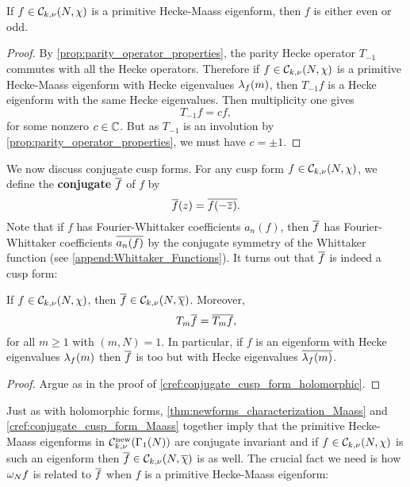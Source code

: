     \begin{proposition}\label{prop:Hecke_Maass_eigenform_even_or_odd}
      If $f \in \mathcal{C}_{k,\nu}(N,\chi)$ is a primitive Hecke-Maass eigenform, then $f$ is either even or odd.
    \end{proposition}
    \begin{proof}
      By \cref{prop:parity_operator_properties}, the parity Hecke operator $T_{-1}$ commutes with all the Hecke operators. Therefore if $f \in \mathcal{C}_{k,\nu}(N,\chi)$ is a primitive Hecke-Maass eigenform with Hecke eigenvalues $\lambda_{f}(m)$, then $T_{-1}f$ is a Hecke eigenform with the same Hecke eigenvalues. Then multiplicity one gives
      \[
        T_{-1}f = cf,
      \]
      for some nonzero $c \in \mathbb{C}$. But as $T_{-1}$ is an involution by \cref{prop:parity_operator_properties}, we must have $c = \pm 1$.
    \end{proof}
    
    We now discuss conjugate cusp forms. For any cusp form $f \in \mathcal{C}_{k,\nu}(N,\chi)$, we define the \textbf{conjugate} $\overline{f}$ of $f$ by
    \[
      \overline{f}(z) = \overline{f(-\overline{z})}.
    \]
    Note that if $f$ has Fourier-Whittaker coefficients $a_{n}(f)$, then $\overline{f}$ has Fourier-Whittaker coefficients $\overline{a_{n}(f)}$ by the conjugate symmetry of the Whittaker function (see \cref{append:Whittaker_Functions}). It turns out that $\overline{f}$ is indeed a cusp form:

    \begin{proposition}\label{cref:conjugate_cusp_form_Maass}
      If $f \in \mathcal{C}_{k,\nu}(N,\chi)$, then $\overline{f} \in \mathcal{C}_{k,\nu}(N,\overline{\chi})$. Moreover,
      \[
        T_{m}\overline{f} = \overline{T_{m}f},
      \]
      for all $m \ge 1$ with $(m,N) = 1$. In particular, if $f$ is an eigenform with Hecke eigenvalues $\lambda_{f}(m)$ then $\overline{f}$ is too but with Hecke eigenvalues $\overline{\lambda_{f}(m)}$.
    \end{proposition}
    \begin{proof}
      Argue as in the proof of \cref{cref:conjugate_cusp_form_holomorphic}.
    \end{proof}

    Just as with holomorphic forms, \cref{thm:newforms_characterization_Maass} and \cref{cref:conjugate_cusp_form_Maass} together imply that the primitive Hecke-Maass eigenforms in $\mathcal{C}_{k,\nu}^{\mathrm{new}}(\Gamma_{1}(N))$ are conjugate invariant and if $f \in \mathcal{C}_{k,\nu}(N,\chi)$ is such an eigenform then $\overline{f} \in \mathcal{C}_{k,\nu}(N,\overline{\chi})$ is as well. The crucial fact we need is how $\omega_{N}f$ is related to $\overline{f}$ when $f$ is a primitive Hecke-Maass eigenform:

